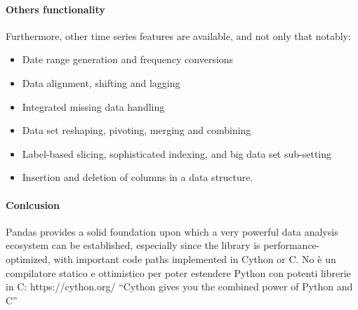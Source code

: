 \paragraph{Others functionality}
Furthermore, other time series features are available, and not only that notably:
\begin{itemize}
    \item Date range generation and frequency conversions
    \item Data alignment, shifting and lagging
    \item Integrated missing data handling
    \item Data set reshaping, pivoting, merging and combining
    \item Label-based slicing, sophisticated indexing, and big data set sub-setting
    \item Insertion and deletion of columns in a data structure.
\end{itemize}
\paragraph{Conlcusion}
Pandas provides a solid foundation upon which a very powerful data analysis ecosystem can be established, especially since the library is performance-optimized,
with important code paths implemented in Cython or C.
No è un compilatore statico e ottimistico per poter estendere Python con potenti librerie in C: https://cython.org/
``Cython gives you the combined power of Python and C''